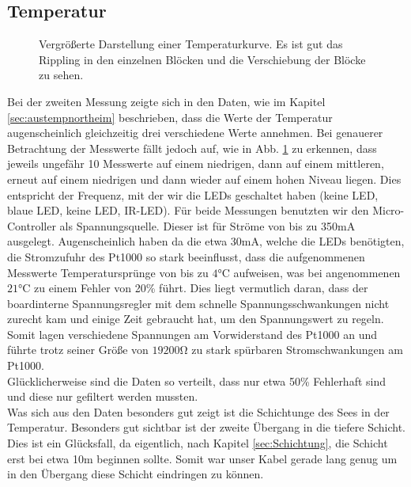 \documentclass[12pt,a4paper,titlepage,headinclude,bibtotoc]{scrartcl}
\numberwithin{equation}{subsection}
\begin{document}
\subsection{Temperatur}
\label{sec:DiskTemp}
\begin{figure}[h]
	\centering
	
	\caption{Vergrößerte Darstellung einer Temperaturkurve. Es ist gut das Rippling in den einzelnen Blöcken und die Verschiebung der Blöcke zu sehen.}
	\label{fig:tempSprung}
\end{figure}
Bei der zweiten Messung zeigte sich in den Daten, wie im Kapitel \ref{sec:austempnortheim} beschrieben, dass die Werte der Temperatur augenscheinlich gleichzeitig drei verschiedene Werte annehmen.
Bei genauerer Betrachtung der Messwerte fällt jedoch auf, wie in Abb. \ref{fig:tempSprung} zu erkennen, dass jeweils ungefähr 10 Messwerte auf einem niedrigen, dann auf einem mittleren, erneut auf einem niedrigen und dann wieder auf einem hohen Niveau liegen.
Dies entspricht der Frequenz, mit der wir die LEDs geschaltet haben (keine LED, blaue LED, keine LED, IR-LED).
Für beide Messungen benutzten wir den Micro-Controller als Spannungsquelle.
Dieser ist für Ströme von bis zu 350mA ausgelegt.
Augenscheinlich haben da die etwa 30\si{\milli\ampere}, welche die LEDs benötigten, die Stromzufuhr des Pt1000 so stark beeinflusst, dass die aufgenommenen Messwerte Temperatursprünge von bis zu $4\si{\celsius}$ aufweisen, was bei angenommenen $21\si{\celsius}$ zu einem Fehler von 20\% führt.
Dies liegt vermutlich daran, dass der boardinterne Spannungsregler mit dem schnelle Spannungsschwankungen nicht zurecht kam und einige Zeit gebraucht hat, um den Spannungswert zu regeln.
Somit lagen verschiedene Spannungen am Vorwiderstand des Pt1000 an und führte trotz seiner Größe von $19200\si{\ohm}$ zu stark spürbaren Stromschwankungen am Pt1000.\\
Glücklicherweise sind die Daten so verteilt, dass nur etwa 50\% Fehlerhaft sind und diese nur gefiltert werden mussten.\\
Was sich aus den Daten besonders gut zeigt ist die Schichtunge des Sees in der Temperatur.
Besonders gut sichtbar ist der zweite Übergang in die tiefere Schicht.
Dies ist ein Glücksfall, da eigentlich, nach Kapitel \ref{sec:Schichtung}, die Schicht erst bei etwa 10\si{\meter} beginnen sollte.
Somit war unser Kabel gerade lang genug um in den Übergang diese Schicht eindringen zu können.
\end{document}
